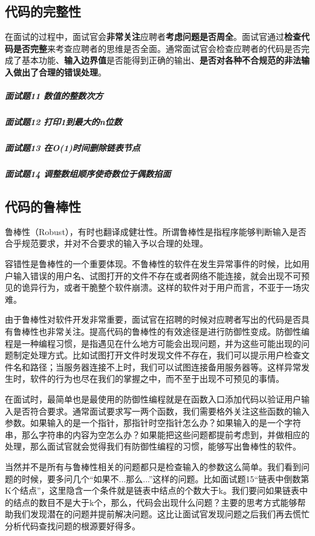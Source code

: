 \documentclass[UTF8,a4paper,12pt]{ctexbook}
\begin{document}
		\subsection{代码的完整性}
			在面试的过程中，面试官会\textbf{非常关注}应聘者\textbf{考虑问题是否周全}。面试官通过\textbf{检查代码是否完整}来考查应聘者的思维是否全面。通常面试官会检查应聘者的代码是否完成了基本功能、\textbf{输入边界值}是否能得到正确的输出、\textbf{是否对各种不合规范的非法输入做出了合理的错误处理}。
			
			\subparagraph{面试题11 数值的整数次方 }
				
			\subparagraph{面试题12 打印1到最大的n位数 }
				
			\subparagraph{面试题13 在O(1)时间删除链表节点}
				
			\subparagraph{面试题14 调整数组顺序使奇数位于偶数掐面} 
				
		\subsection{代码的鲁棒性}
			鲁棒性（Robust），有时也翻译成健壮性。所谓鲁棒性是指程序能够判断输入是否合乎规范要求，并对不合要求的输入予以合理的处理。
			
			容错性是鲁棒性的一个重要体现。不鲁棒性的软件在发生异常事件的时候，比如用户输入错误的用户名、试图打开的文件不存在或者网络不能连接，就会出现不可预见的诡异行为，或者干脆整个软件崩溃。这样的软件对于用户而言，不亚于一场灾难。
			
			由于鲁棒性对软件开发非常重要，面试官在招聘的时候对应聘者写出的代码是否具有鲁棒性也非常关注。提高代码的鲁棒性的有效途径是进行防御性变成。防御性编程是一种编程习惯，是指遇见在什么地方可能会出现问题，并为这些可能出现的问题制定处理方式。比如试图打开文件时发现文件不存在，我们可以提示用户检查文件名和路径；当服务器连接不上时，我们可以试图连接备用服务器等。这样异常发生时，软件的行为也尽在我们的掌握之中，而不至于出现不可预见的事情。
			
			在面试时，最简单也是最使用的防御性编程就是在函数入口添加代码以验证用户输入是否符合要求。通常面试要求写一两个函数，我们需要格外关注这些函数的输入参数。如果输入的是一个指针，那指针时空指针怎么办？如果输入的是一个字符串，那么字符串的内容为空怎么办？如果能把这些问题都提前考虑到，并做相应的处理，那么面试官就会觉得我们有防御性编程的习惯，能够写出鲁棒性的软件。
			
			当然并不是所有与鲁棒性相关的问题都只是检查输入的参数这么简单。我们看到问题的时候，要多问几个“如果不...那么...”这样的问题。比如面试题15“链表中倒数第K个结点”，这里隐含一个条件就是链表中结点的个数大于k。我们要问如果链表中的结点的数目不是大于k个，那么，代码会出现什么问题？主要的思考方式能够帮助我们发现潜在的问题并提前解决问题。这比让面试官发现问题之后我们再去慌忙分析代码查找问题的根源要好得多。
			
\end{document}
